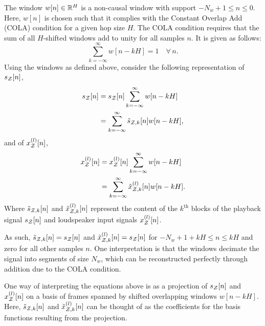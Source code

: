 The window $w[n]\in\mathbb{R}^{H}$ is a non-causal window with support $-N_w + 1 \leq n \leq 0$. 
Here, $w[n]$ is chosen such that it complies with the Constant Overlap Add (COLA) condition for a given hop size $H$.
The COLA condition requires that the sum of all $H$-shifted windows add to unity for all samples $n$. 
It is given as follows:
\begin{equation}
     \sum_{k=-\infty}^{\infty} w[n - kH] = 1 \quad\forall\,n.
\end{equation}
Using the windows as defined above, consider the following representation of $s_{\mathcal{Z}}[n]$,
\begin{equation}
    \begin{aligned}
        s_{\mathcal{Z}}[n] &= s_{\mathcal{Z}}[n]\sum_{k=-\infty}^{\infty} w[n - kH] \\
                 &= \sum_{k=-\infty}^{\infty} \tilde{s}_{\mathcal{Z},k}[n]w[n - kH],
    \end{aligned}
    \label{eq:perceptual_sound_zones:stft:block_based:desired_playback}
\end{equation}
and of $x^{(l)}_{\mathcal{Z}}[n]$,
\begin{equation}
    \begin{aligned}
        x^{(l)}_{\mathcal{Z}}[n] &= x^{(l)}_{\mathcal{Z}}[n]\sum_{k=-\infty}^{\infty} w[n - kH] \\
                       &= \sum_{k=-\infty}^{\infty} \tilde{x}^{(l)}_{\mathcal{Z},k}[n]w[n - kH].
    \end{aligned}
    \label{eq:perceptual_sound_zones:stft:block_based:loudspeaker_inputs}
\end{equation}
Where $\tilde{s}_{\mathcal{Z},k}[n]$ and $\tilde{x}^{(l)}_{\mathcal{Z},k}[n]$ represent the content of the $k^\text{th}$ blocks of the playback signal $s_{\mathcal{Z}}[n]$ and loudspeaker input signals $x^{(l)}_{\mathcal{Z}}[n]$.

As such, $\tilde{s}_{\mathcal{Z},k}[n] = s_{\mathcal{Z}}[n]$ and $\tilde{x}^{(l)}_{\mathcal{Z},k}[n] = s_{\mathcal{Z}}[n]$ for $-N_w + 1 + kH \leq n \leq kH$ and zero for all other samples $n$.  
One interpretation is that the windows decimate the signal into segments of size $N_w$, which can be reconstructed perfectly through addition due to the COLA condition.

One way of interpreting the equations above is as a projection of $s_{\mathcal{Z}}[n]$ and $x^{(l)}_{\mathcal{Z}}[n]$ on a basis of frames spanned by shifted overlapping windows $w[n - kH]$.
Here, $\tilde{s}_{\mathcal{Z},k}[n]$ and $\tilde{x}^{(l)}_{\mathcal{Z},k}[n]$ can be thought of as the coefficients for the basis functions resulting from the projection.

